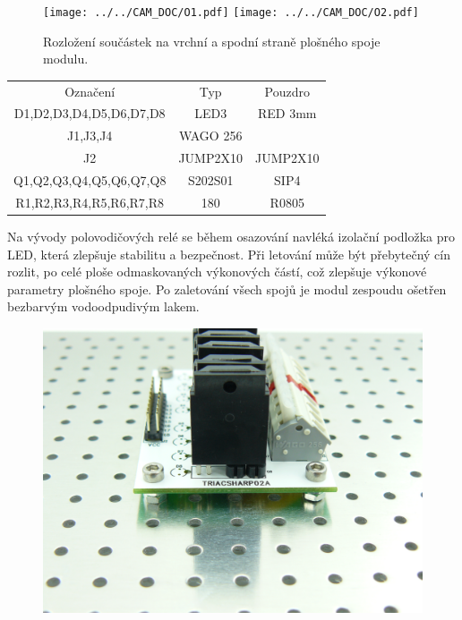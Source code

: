 \documentclass[12pt,a4paper,oneside]{article}
\begin{document}
\begin{figure} [htbp]
  \texttt{[image: ../../CAM\_DOC/O1.pdf]}
  \texttt{[image: ../../CAM\_DOC/O2.pdf]}
  \caption{Rozložení součástek na vrchní a spodní straně plošného spoje modulu.}
\end{figure}


\begin{table}
\begin{tabular}{ccc}
Označení & Typ & Pouzdro\\ 
D1,D2,D3,D4,D5,D6,D7,D8	&	LED3		&	RED 3mm \\
J1,J3,J4	 & WAGO 256 & \\ 
J2 &		JUMP2X10		& JUMP2X10 \\
Q1,Q2,Q3,Q4,Q5,Q6,Q7,Q8	& S202S01	&	SIP4 \\
R1,R2,R3,R4,R5,R6,R7,R8 & 180	&  R0805 \\
\end{tabular} 
\end{table}


Na vývody polovodičových relé se během osazování navléká izolační podložka pro LED, která zlepšuje stabilitu a bezpečnost.  Při letování může být přebytečný cín rozlit, po celé ploše odmaskovaných výkonových částí, což zlepšuje výkonové parametry plošného spoje.  Po zaletování všech spojů je modul zespoudu ošetřen bezbarvým vodoodpudivým lakem. 

\begin{figure} [htbp]
\centering
\includegraphics [width=130mm] {./img/TRIACSHARP02A_Big_Side.JPG} 
\end{figure}
\end{document}
